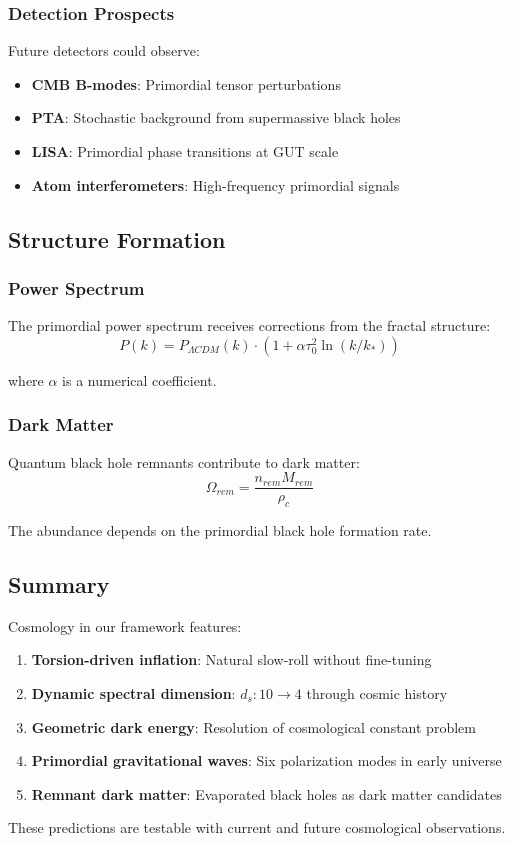 \subsubsection{Detection Prospects}

Future detectors could observe:
\begin{itemize}
    \item \textbf{CMB B-modes}: Primordial tensor perturbations
    \item \textbf{PTA}: Stochastic background from supermassive black holes
    \item \textbf{LISA}: Primordial phase transitions at GUT scale
    \item \textbf{Atom interferometers}: High-frequency primordial signals
\end{itemize}

\subsection{Structure Formation}

\subsubsection{Power Spectrum}

The primordial power spectrum receives corrections from the fractal structure:
\begin{equation}
    P(k) = P_{\Lambda CDM}(k) \cdot (1 + \alpha \tau_0^2 \ln(k/k_*))
\end{equation}

where $\alpha$ is a numerical coefficient.

\subsubsection{Dark Matter}

Quantum black hole remnants contribute to dark matter:
\begin{equation}
    \Omega_{rem} = \frac{n_{rem} M_{rem}}{\rho_c}
\end{equation}

The abundance depends on the primordial black hole formation rate.

\subsection{Summary}

Cosmology in our framework features:
\begin{enumerate}
    \item \textbf{Torsion-driven inflation}: Natural slow-roll without fine-tuning
    \item \textbf{Dynamic spectral dimension}: $d_s: 10 \to 4$ through cosmic history
    \item \textbf{Geometric dark energy}: Resolution of cosmological constant problem
    \item \textbf{Primordial gravitational waves}: Six polarization modes in early universe
    \item \textbf{Remnant dark matter}: Evaporated black holes as dark matter candidates
\end{enumerate}

These predictions are testable with current and future cosmological observations.
